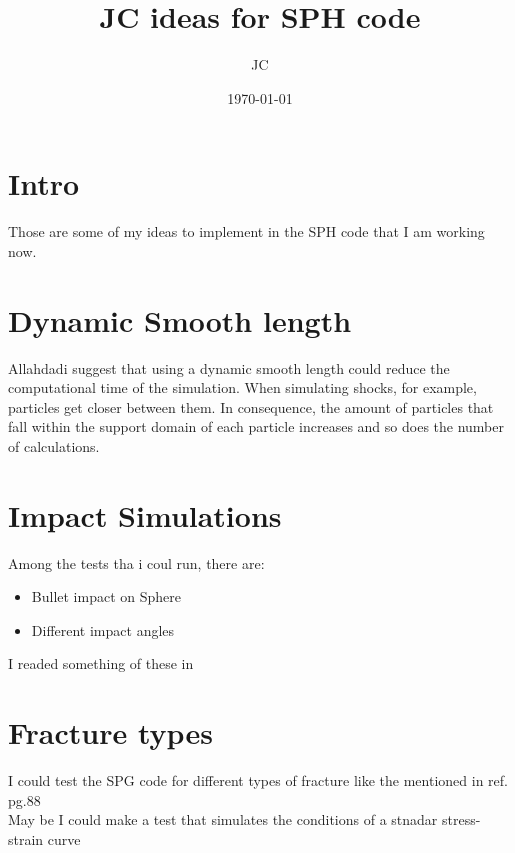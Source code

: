 \documentclass[12pt]{article}
\title{JC ideas for SPH code}
\date{\today}
\author{JC}
\begin{document}
\maketitle
\tableofcontents

\section{Intro}
Those are some of my ideas to implement in the SPH code that I am working now.

\section{Dynamic Smooth length}
Allahdadi\cite{allahdadi93} suggest that using a dynamic smooth length could reduce the computational time of the simulation. When simulating shocks, for example, particles get closer between them. In consequence, the amount of particles that fall within the support domain of each particle increases and so does the number of calculations.

\section{Impact Simulations}
Among the tests tha i coul run, there are:
\begin{itemize}
\item Bullet impact on Sphere
\item Different impact angles
\end{itemize}
I readed something of these in \cite{benz95}

\section{Fracture types}
I could test the SPG code for different types of fracture like the mentioned in ref. \cite{Jaeger_rm} pg.88\\
May be I could make a test that simulates the conditions of a stnadar stress-strain curve



\end{document}
